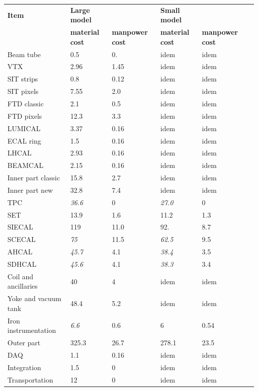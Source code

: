 \begin{table}[h!]\hspace*{-0cm}\small
\begin{tabular}{ l p{0.15\hsize}p{0.15\hsize}p{0.15\hsize} p{0.15\hsize}p{0.15\hsize}}
\toprule
\bf {Item}& \bf {Large model} & \bf              &  \bf {Small model}&\bf \\
\bf       & \bf material cost & \bf manpower cost&  \bf material cost&\bf manpower cost\\
\midrule
Beam tube & 0.5 &  0.& idem&idem \\
VTX        & 2.96  &1.45  &  idem &idem \\
SIT strips & 0.8   &0.12 & idem&idem\\
SIT pixels & 7.55  &2.0 & idem&idem\\
FTD classic & 2.1   &0.5  & idem &idem  \\
FTD pixels  & 12.3  &3.3  & idem &idem  \\
LUMICAL & 3.37  & 0.16& idem&idem\\
ECAL ring & 1.5 & 0.16 & idem&idem\\
LHCAL   & 2.93  & 0.16&idem& idem\\
BEAMCAL & 2.15  & 0.16& idem&idem\\
Inner part classic&15.8&2.7&idem&idem\\
Inner part new    &32.8&7.4&idem&idem\\
\midrule
TPC & \it36.6 & 0 & \it27.0 & 0\\
SET    & 13.9& 1.6&11.2&1.3\\
SIECAL & 119 & 11.0 & 92. & 8.7\\
SCECAL & \it75 & 11.5 & \it62.5 & 9.5\\
AHCAL  & \it45.7 & 4.1 & \it38.4 & 3.5\\
SDHCAL & \it45.6 & 4.1 & \it38.3 & 3.4\\
Coil and ancillaries &  40 & 4& idem & idem\\
Yoke and vacuum tank &  48.4 & 5.2& idem & idem \\
Iron instrumentation  &  \it6.6 & 0.6 & 6 & 0.54\\
Outer part&325.3&26.7&278.1&23.5\\
\midrule
DAQ           & 1.1 & 0.16& idem& idem\\
Integration   & 1.5 & 0   & idem& idem\\ 
Transportation& 12  & 0   & idem & idem \\

\end{tabular}
\end{table}
